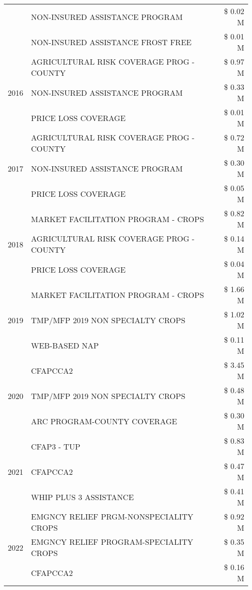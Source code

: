 \begin{tabular}{llr}
 & NON-INSURED ASSISTANCE PROGRAM & \$ 0.02 M \\
 & NON-INSURED ASSISTANCE FROST FREE & \$ 0.01 M \\
\cline{1-3}
\multirow[t]{3}{*}{2016} & AGRICULTURAL RISK COVERAGE PROG - COUNTY & \$ 0.97 M \\
 & NON-INSURED ASSISTANCE PROGRAM & \$ 0.33 M \\
 & PRICE LOSS COVERAGE & \$ 0.01 M \\
\cline{1-3}
\multirow[t]{3}{*}{2017} & AGRICULTURAL RISK COVERAGE PROG - COUNTY & \$ 0.72 M \\
 & NON-INSURED ASSISTANCE PROGRAM & \$ 0.30 M \\
 & PRICE LOSS COVERAGE & \$ 0.05 M \\
\cline{1-3}
\multirow[t]{3}{*}{2018} & MARKET FACILITATION PROGRAM - CROPS & \$ 0.82 M \\
 & AGRICULTURAL RISK COVERAGE PROG - COUNTY & \$ 0.14 M \\
 & PRICE LOSS COVERAGE & \$ 0.04 M \\
\cline{1-3}
\multirow[t]{3}{*}{2019} & MARKET FACILITATION PROGRAM - CROPS & \$ 1.66 M \\
 & TMP/MFP 2019 NON SPECIALTY CROPS & \$ 1.02 M \\
 & WEB-BASED NAP & \$ 0.11 M \\
\cline{1-3}
\multirow[t]{3}{*}{2020} & CFAPCCA2 & \$ 3.45 M \\
 & TMP/MFP 2019 NON SPECIALTY CROPS & \$ 0.48 M \\
 & ARC PROGRAM-COUNTY COVERAGE & \$ 0.30 M \\
\cline{1-3}
\multirow[t]{3}{*}{2021} & CFAP3 - TUP & \$ 0.83 M \\
 & CFAPCCA2 & \$ 0.47 M \\
 & WHIP PLUS 3 ASSISTANCE & \$ 0.41 M \\
\cline{1-3}
\multirow[t]{3}{*}{2022} & EMGNCY RELIEF PRGM-NONSPECIALITY CROPS & \$ 0.92 M \\
 & EMGNCY RELIEF PROGRAM-SPECIALITY CROPS & \$ 0.35 M \\
 & CFAPCCA2 & \$ 0.16 M \\
\cline{1-3}
\bottomrule
\end{tabular}
